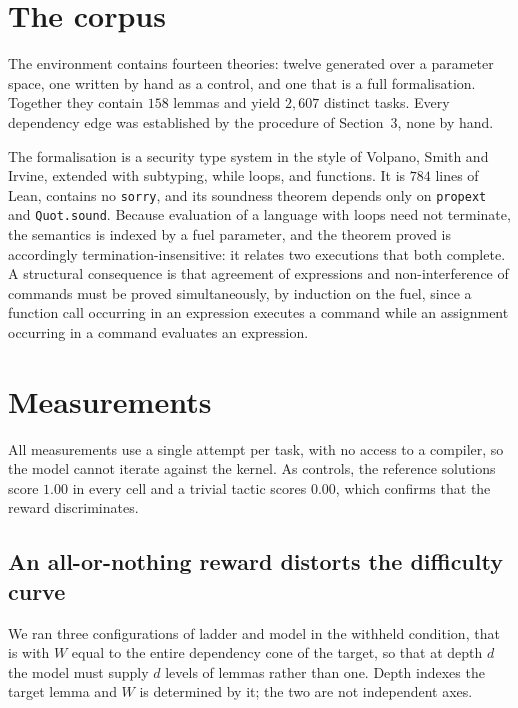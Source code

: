 \documentclass[11pt]{article}
\begin{document}
\section{The corpus}

The environment contains fourteen theories: twelve generated over a parameter
space, one written by hand as a control, and one that is a full formalisation.
Together they contain $158$ lemmas and yield $2{,}607$ distinct tasks. Every
dependency edge was established by the procedure of Section~3, none by hand.

The formalisation is a security type system in the style of Volpano, Smith and
Irvine, extended with subtyping, while loops, and functions. It is $784$ lines of
Lean, contains no \verb|sorry|, and its soundness theorem depends only on
\verb|propext| and \verb|Quot.sound|. Because evaluation of a language with loops
need not terminate, the semantics is indexed by a fuel parameter, and the theorem
proved is accordingly termination-insensitive: it relates two executions that
both complete. A structural consequence is that agreement of expressions and
non-interference of commands must be proved simultaneously, by induction on the
fuel, since a function call occurring in an expression executes a command while
an assignment occurring in a command evaluates an expression.

\section{Measurements}

All measurements use a single attempt per task, with no access to a compiler, so
the model cannot iterate against the kernel. As controls, the reference solutions
score $1.00$ in every cell and a trivial tactic scores $0.00$, which confirms
that the reward discriminates.

\subsection{An all-or-nothing reward distorts the difficulty curve}

We ran three configurations of ladder and model in the withheld condition, that
is with $W$ equal to the entire dependency cone of the target, so that at depth
$d$ the model must supply $d$ levels of lemmas rather than one. Depth indexes the
target lemma and $W$ is determined by it; the two are not independent axes.
\end{document}
